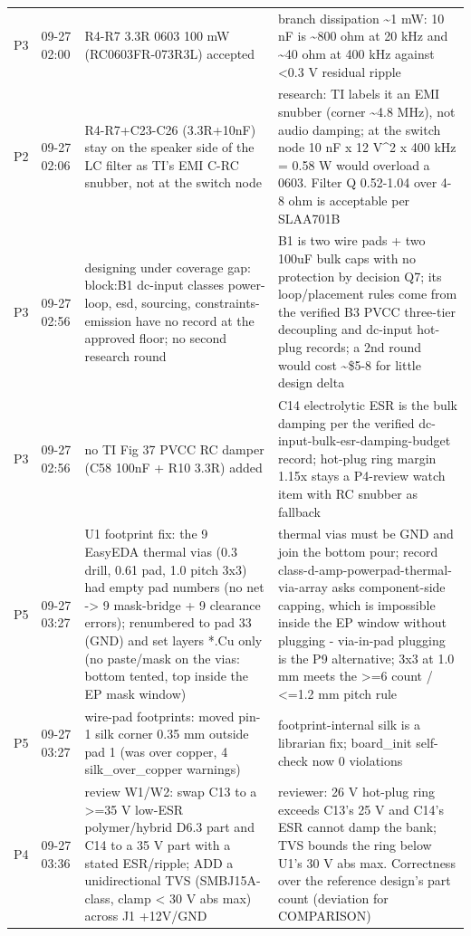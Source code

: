 \documentclass[11pt]{article}
\begin{document}
{\begin{longtable}{lp{1.6cm}p{6.2cm}p{6.2cm}}
P3 & 09-27 02:00 & R4-R7 3.3R 0603 100 mW (RC0603FR-073R3L) accepted & branch dissipation \textasciitilde{}1 mW: 10 nF is \textasciitilde{}800 ohm at 20 kHz and \textasciitilde{}40 ohm at 400 kHz against \textless{}0.3 V residual ripple \\
P2 & 09-27 02:06 & R4-R7+C23-C26 (3.3R+10nF) stay on the speaker side of the LC filter as TI's EMI C-RC snubber, not at the switch node & research: TI labels it an EMI snubber (corner \textasciitilde{}4.8 MHz), not audio damping; at the switch node 10 nF x 12 V\textasciicircum{}2 x 400 kHz = 0.58 W would overload a 0603. Filter Q 0.52-1.04 over 4-8 ohm is acceptable per SLAA701B \\
P3 & 09-27 02:56 & designing under coverage gap: block:B1 dc-input classes power-loop, esd, sourcing, constraints-emission have no record at the approved floor; no second research round & B1 is two wire pads + two 100uF bulk caps with no protection by decision Q7; its loop/placement rules come from the verified B3 PVCC three-tier decoupling and dc-input hot-plug records; a 2nd round would cost \textasciitilde{}\$5-8 for little design delta \\
P3 & 09-27 02:56 & no TI Fig 37 PVCC RC damper (C58 100nF + R10 3.3R) added & C14 electrolytic ESR is the bulk damping per the verified dc-input-bulk-esr-damping-budget record; hot-plug ring margin 1.15x stays a P4-review watch item with RC snubber as fallback \\
P5 & 09-27 03:27 & U1 footprint fix: the 9 EasyEDA thermal vias (0.3 drill, 0.61 pad, 1.0 pitch 3x3) had empty pad numbers (no net -\textgreater{} 9 mask-bridge + 9 clearance errors); renumbered to pad 33 (GND) and set layers {*}.Cu only (no paste/mask on the vias: bottom tented, top inside the EP mask window) & thermal vias must be GND and join the bottom pour; record class-d-amp-powerpad-thermal-via-array asks component-side capping, which is impossible inside the EP window without plugging - via-in-pad plugging is the P9 alternative; 3x3 at 1.0 mm meets the \textgreater{}=6 count / \textless{}=1.2 mm pitch rule \\
P5 & 09-27 03:27 & wire-pad footprints: moved pin-1 silk corner 0.35 mm outside pad 1 (was over copper, 4 silk\_over\_copper warnings) & footprint-internal silk is a librarian fix; board\_init self-check now 0 violations \\
P4 & 09-27 03:36 & review W1/W2: swap C13 to a \textgreater{}=35 V low-ESR polymer/hybrid D6.3 part and C14 to a 35 V part with a stated ESR/ripple; ADD a unidirectional TVS (SMBJ15A-class, clamp \textless{} 30 V abs max) across J1 +12V/GND & reviewer: 26 V hot-plug ring exceeds C13's 25 V and C14's ESR cannot damp the bank; TVS bounds the ring below U1's 30 V abs max. Correctness over the reference design's part count (deviation for COMPARISON) \\

\end{longtable}}
\end{document}
